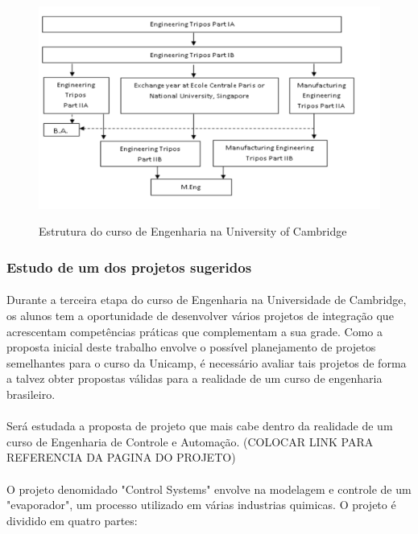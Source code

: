 \documentclass[12pt]{article} %
\begin{document}
\begin{figure}[H]
\centering
\includegraphics[scale=0.2]{pictures/gradeCambridge.png}\\
\caption{Estrutura do curso de Engenharia na University of Cambridge}
\end{figure}

\subsubsection{Estudo de um dos projetos sugeridos}

\paragraph{} Durante a terceira etapa do curso de Engenharia na Universidade de Cambridge, os alunos tem a oportunidade de desenvolver vários projetos de integração que acrescentam competências práticas que complementam a sua grade. Como a proposta inicial deste trabalho envolve o possível planejamento de projetos semelhantes para o curso da Unicamp, é necessário avaliar tais projetos de forma a talvez obter propostas válidas para a realidade de um curso de engenharia brasileiro.

\paragraph{} Será estudada a proposta de projeto que mais cabe dentro da realidade de um curso de Engenharia de Controle e Automação. (COLOCAR LINK PARA REFERENCIA DA PAGINA DO PROJETO)

\paragraph{} O projeto denomidado "Control Systems" envolve na modelagem e controle de um "evaporador", um processo utilizado em várias industrias quimicas. O projeto é dividido em quatro partes:
\end{document}
